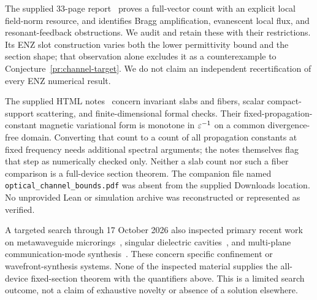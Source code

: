 The supplied 33-page report~\cite{priorreport} proves a full-vector count with an explicit local field-norm resource, and identifies Bragg amplification, evanescent local flux, and resonant-feedback obstructions. We audit and retain these with their restrictions. Its ENZ slot construction varies both the lower permittivity bound and the section shape; that observation alone excludes it as a counterexample to Conjecture~\ref{pr:channel-target}. We do not claim an independent recertification of every ENZ numerical result.

The supplied HTML notes~\cite{priorhtml} concern invariant slabs and fibers, scalar compact-support scattering, and finite-dimensional formal checks. Their fixed-propagation-constant magnetic variational form is monotone in $\varepsilon^{-1}$ on a common divergence-free domain. Converting that count to a count of all propagation constants at fixed frequency needs additional spectral arguments; the notes themselves flag that step as numerically checked only. Neither a slab count nor such a fiber comparison is a full-device section theorem. The companion file named \texttt{optical\_channel\_bounds.pdf} was absent from the supplied Downloads location. No unprovided Lean or simulation archive was reconstructed or represented as verified.

A targeted search through 17 October 2026 also inspected primary recent work on metawaveguide microrings~\cite{gafsi2025}, singular dielectric cavities~\cite{mao2025}, and multi-plane communication-mode synthesis~\cite{deAngelis2026}. These concern specific confinement or wavefront-synthesis systems. None of the inspected material supplies the all-device fixed-section theorem with the quantifiers above. This is a limited search outcome, not a claim of exhaustive novelty or absence of a solution elsewhere.
